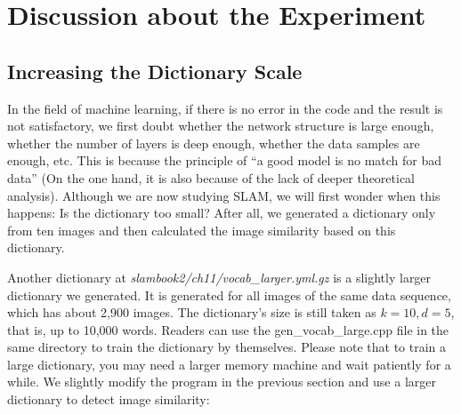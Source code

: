 \section{Discussion about the Experiment}
\subsection{Increasing the Dictionary Scale}
In the field of machine learning, if there is no error in the code and the result is not satisfactory, we first doubt whether the network structure is large enough, whether the number of layers is deep enough, whether the data samples are enough, etc. This is because the principle of ``a good model is no match for bad data'' (On the one hand, it is also because of the lack of deeper theoretical analysis). Although we are now studying SLAM, we will first wonder when this happens: Is the dictionary too small? After all, we generated a dictionary only from ten images and then calculated the image similarity based on this dictionary.

Another dictionary at \textit{slambook2/ch11/vocab\_larger.yml.gz} is a slightly larger dictionary we generated. It is generated for all images of the same data sequence, which has about 2,900 images. The dictionary's size is still taken as $k=10,d=5$, that is, up to 10,000 words. Readers can use the gen\_vocab\_large.cpp file in the same directory to train the dictionary by themselves. Please note that to train a large dictionary, you may need a larger memory machine and wait patiently for a while. We slightly modify the program in the previous section and use a larger dictionary to detect image similarity:

